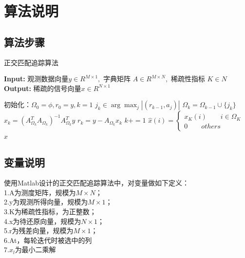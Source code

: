 \documentclass{article}
\begin{document}
\section{算法说明}
\subsection{算法步骤}
	\begin{algorithm}[H]
		\caption{正交匹配追踪算法} 
		\hspace*{0.02in} {\bf Input:} 
		观测数据向量$ y\in R^{M\times 1},$ 字典矩阵 $ A \in R^{M\times N},$ 稀疏性指标 $K\in N$\\
		\hspace*{0.02in} {\bf Output:} 
		稀疏的信号向量$ x \in R^{N\times 1}$ 
		\begin{algorithmic}[1]
			\State 初始化：$ \Omega_0=\phi,r_0=y,k=1 $ 
			\State $ j_k\in \arg{\max_j{|(r_{k-1},a_j)|}} $
			\State $ \Omega_k = \Omega_{k-1}\cup \{j_k\} $
			\State $ x_k = (A_{\Omega_k}^{T}A_{\Omega_k})^{-1}A_{\Omega_k}^{T}y $
			\State $ r_k = y-A_{\Omega_k}x_k $
			\State $ k += 1 $
			\EndWhile
			\State $  \hat{x}(i) = \left\{
			\begin{aligned}
				x_K(i) \qquad i\in \Omega_K\\
				0 \qquad others
			\end{aligned} 
			\right. $
			\State \Return $ \hat{x} $
		\end{algorithmic}
	\end{algorithm}
\subsection{变量说明}
使用Matlab设计的正交匹配追踪算法中，对变量做如下定义：\\
1.A为测度矩阵，规模为$ M\times N $；\\
2.y为观测所得向量，规模为$ M\times 1 $；\\
3.K为稀疏性指标，为正整数；\\
4.x为待还原向量，规模为$ N\times 1 $；\\
5.r为残差向量，规模为$ M\times 1 $；\\
6.At，每轮迭代时被选中的列\\
7.$ x_l $为最小二乘解
\end{document}
